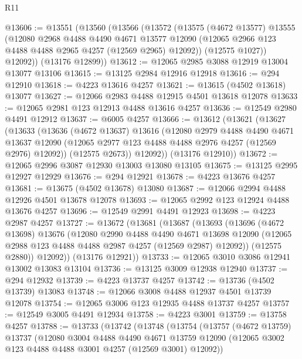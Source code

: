 \begin{lexlean}{R11}
\begin{coremodule}
@13606 := @13551
    (@13560
      (@13566
        (@13572
          (@13575
            (@4672 @13577)
            @13555
            (@12080
              @2968
              @4488
              @4490
              @4671
              @13577
              @12090
              (@12065 @2966 @123 @4488 @4488 @2965 @4257 (@12569 @2965) @12092))
            (@12575 @1027))
          @12092))
      (@13176 @12899))
@13612 := @12065 @2985 @3088 @12919 @13004 @13077 @13106
@13615 := @13125 @2984 @12916 @12918
@13616 := @294 @12910
@13618 := @4223 @13616 @4257
@13621 := @13615 (@4502 @13618) @13077
@13627 := @12066 @2983 @4488 @12915 @4501 @13618 @12078
@13633 := @12065 @2981 @123 @12913 @4488 @13616 @4257
@13636 := @12549 @2980 @4491 @12912
@13637 := @6005 @4257
@13666 := @13612
    (@13621
      (@13627
        (@13633
          (@13636
            (@4672 @13637)
            @13616
            (@12080
              @2979
              @4488
              @4490
              @4671
              @13637
              @12090
              (@12065 @2977 @123 @4488 @4488 @2976 @4257 (@12569 @2976) @12092))
            (@12575 @2673))
          @12092))
      (@13176 @12910))
@13672 := @12065 @2996 @3087 @12930 @13003 @13080 @13105
@13675 := @13125 @2995 @12927 @12929
@13676 := @294 @12921
@13678 := @4223 @13676 @4257
@13681 := @13675 (@4502 @13678) @13080
@13687 := @12066 @2994 @4488 @12926 @4501 @13678 @12078
@13693 := @12065 @2992 @123 @12924 @4488 @13676 @4257
@13696 := @12549 @2991 @4491 @12923
@13698 := @4223 @2987 @4257
@13727 := @13672
    (@13681
      (@13687
        (@13693
          (@13696
            (@4672 @13698)
            @13676
            (@12080
              @2990
              @4488
              @4490
              @4671
              @13698
              @12090
              (@12065 @2988 @123 @4488 @4488 @2987 @4257 (@12569 @2987) @12092))
            (@12575 @2880))
          @12092))
      (@13176 @12921))
@13733 := @12065 @3010 @3086 @12941 @13002 @13083 @13104
@13736 := @13125 @3009 @12938 @12940
@13737 := @294 @12932
@13739 := @4223 @13737 @4257
@13742 := @13736 (@4502 @13739) @13083
@13748 := @12066 @3008 @4488 @12937 @4501 @13739 @12078
@13754 := @12065 @3006 @123 @12935 @4488 @13737 @4257
@13757 := @12549 @3005 @4491 @12934
@13758 := @4223 @3001
@13759 := @13758 @4257
@13788 := @13733
    (@13742
      (@13748
        (@13754
          (@13757
            (@4672 @13759)
            @13737
            (@12080
              @3004
              @4488
              @4490
              @4671
              @13759
              @12090
              (@12065 @3002 @123 @4488 @4488 @3001 @4257 (@12569 @3001) @12092))

\end{coremodule}
\end{lexlean}
